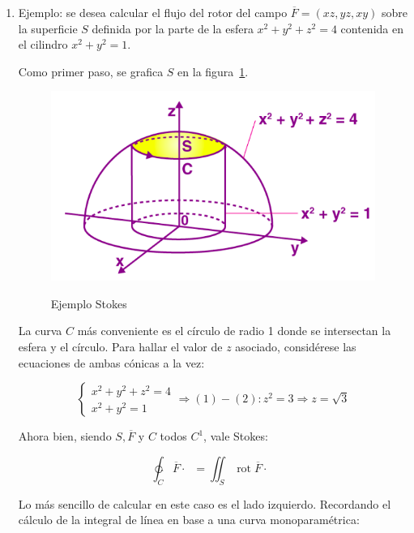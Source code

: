 \documentclass{article}
\begin{document}
\begin{enumerate}
\item Ejemplo: se desea calcular el flujo del rotor del campo $\overline{F} = (xz, yz, xy)$ sobre la superficie $S$ definida por la parte de la esfera $x^2 + y^2 + z^2 = 4$ contenida en el cilindro $x^2 + y^2 = 1$.

Como primer paso, se grafica $S$ en la figura~\ref{fig:stokesex}.

\begin{figure}[ht]
\centering
\caption{Ejemplo Stokes}
\includegraphics[scale=0.7]{img/teo_fig035_stokesex.png}
\label{fig:stokesex}
\end{figure}

La curva $C$ más conveniente es el círculo de radio 1 donde se intersectan la esfera y el círculo. Para hallar el valor de $z$ asociado, considérese las ecuaciones de ambas cónicas a la vez:

\begin{equation}
\left\{
\begin{array}{ll}
x^2 + y^2 + z^2 = 4 \\
x^2 + y^2 = 1
\end{array}
\right. \Rightarrow (1) - (2): z^2 = 3 \Rightarrow z = \sqrt{3}
\end{equation}

Ahora bien, siendo $S, \overline{F}$ y $C$ todos $C^1$, vale Stokes:

\begin{equation}
\ointctrclockwise_C \overline{F} \cdot \mathop{\overline{dC}} = \iint_S \mathop{rot}\overline{F} \cdot \mathop{\overline{dS}}
\end{equation} 

Lo más sencillo de calcular en este caso es el lado izquierdo. Recordando el cálculo de la integral de línea en base a una curva monoparamétrica:


\end{enumerate}
\end{document}

